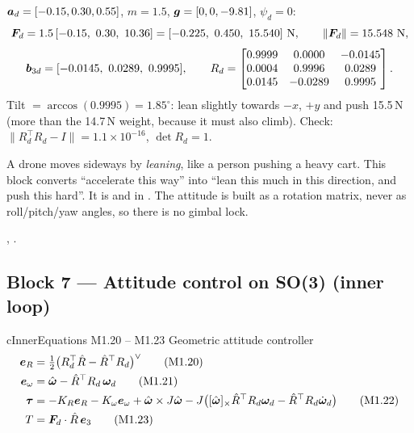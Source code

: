 \begin{toybox}
$\bm{a}_d=[-0.15,0.30,0.55]$, $m=1.5$, $\bm{g}=[0,0,-9.81]$, $\psi_d=0$:
\[
\vF_d=1.5\,[-0.15,\ 0.30,\ 10.36]=[-0.225,\ 0.450,\ 15.540]\ \text{N},\qquad \|\vF_d\|=15.548\ \text{N},
\]
\[
\bm{b}_{3d}=[-0.0145,\ 0.0289,\ 0.9995],\qquad
R_d=\begin{bmatrix}0.9999&0.0000&-0.0145\\0.0004&0.9996&0.0289\\0.0145&-0.0289&0.9995\end{bmatrix}.
\]
Tilt $=\arccos(0.9995)=1.85^\circ$: lean slightly towards $-x$, $+y$ and push 15.5\,N (more than the 14.7\,N weight,
because it must also climb). Check: $\|R_d^\top R_d-I\|=1.1\times10^{-16}$, $\det R_d=1$.
\end{toybox}

\begin{projbox}
A drone moves sideways by \emph{leaning}, like a person pushing a heavy cart. This block converts ``accelerate
this way'' into ``lean this much in this direction, and push this hard''. It is 
and  in . The attitude is built as a rotation matrix,
never as roll/pitch/yaw angles, so there is no gimbal lock.
\end{projbox}

\begin{codebox}
\intoy {}, .
\end{codebox}

\subsection{Block 7 --- Attitude control on SO(3) (inner loop)}
\label{sec:m1b7}

\begin{eqbox}{cInner}{Equations M1.20 -- M1.23 \quad Geometric attitude controller}
\begin{align}
  \bm{e}_R &= \tfrac12\big(R_d^\top\hat{R}-\hat{R}^\top R_d\big)^\vee \tag{M1.20}\label{eq:m1.20}\\
  \bm{e}_\omega &= \hat{\bm\omega}-\hat{R}^\top R_d\,\bm{\omega}_d \tag{M1.21}\label{eq:m1.21}\\
  \bm{\tau} &= -K_R\bm{e}_R-K_\omega\bm{e}_\omega+\hat{\bm\omega}\times J\hat{\bm\omega}
          -J\big([\hat{\bm\omega}]_{\times}\hat{R}^\top R_d\bm{\omega}_d-\hat{R}^\top R_d\dot{\bm{\omega}}_d\big) \tag{M1.22}\label{eq:m1.22}\\
  T &= \bm{F}_d\cdot\hat{R}\,\bm{e}_3 \tag{M1.23}\label{eq:m1.23}
\end{align}
\end{eqbox}

